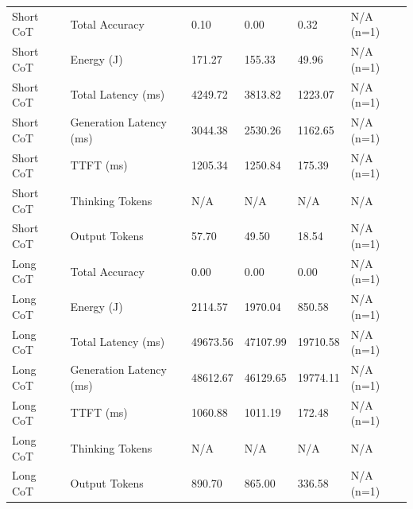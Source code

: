 \begin{table}
\begin{tabular}{llllll}
Short CoT & Total Accuracy & 0.10 & 0.00 & 0.32 & N/A (n=1) \\
Short CoT & Energy (J) & 171.27 & 155.33 & 49.96 & N/A (n=1) \\
Short CoT & Total Latency (ms) & 4249.72 & 3813.82 & 1223.07 & N/A (n=1) \\
Short CoT & Generation Latency (ms) & 3044.38 & 2530.26 & 1162.65 & N/A (n=1) \\
Short CoT & TTFT (ms) & 1205.34 & 1250.84 & 175.39 & N/A (n=1) \\
Short CoT & Thinking Tokens & N/A & N/A & N/A & N/A \\
Short CoT & Output Tokens & 57.70 & 49.50 & 18.54 & N/A (n=1) \\
Long CoT & Total Accuracy & 0.00 & 0.00 & 0.00 & N/A (n=1) \\
Long CoT & Energy (J) & 2114.57 & 1970.04 & 850.58 & N/A (n=1) \\
Long CoT & Total Latency (ms) & 49673.56 & 47107.99 & 19710.58 & N/A (n=1) \\
Long CoT & Generation Latency (ms) & 48612.67 & 46129.65 & 19774.11 & N/A (n=1) \\
Long CoT & TTFT (ms) & 1060.88 & 1011.19 & 172.48 & N/A (n=1) \\
Long CoT & Thinking Tokens & N/A & N/A & N/A & N/A \\
Long CoT & Output Tokens & 890.70 & 865.00 & 336.58 & N/A (n=1) \\
\bottomrule
\end{tabular}
\end{table}
